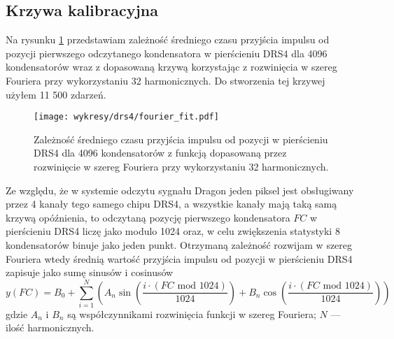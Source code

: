 \documentclass[a4paper,11pt,twoside]{article}
\begin{document}
\subsection{Krzywa kalibracyjna}
Na rysunku \ref{fig:fourier_fit_4096} przedstawiam zależność średniego czasu przyjścia impulsu od pozycji pierwszego odczytanego kondensatora w pierścieniu DRS4 dla 4096 kondensatorów wraz z dopasowaną krzywą korzystając z rozwinięcia w szereg Fouriera przy wykorzystaniu 32 harmonicznych. Do stworzenia tej krzywej użyłem 11 500 zdarzeń.
\begin{figure}[H] 
\centering
\texttt{[image: wykresy/drs4/fourier\_fit.pdf]}
\caption{Zależność średniego czasu przyjścia impulsu od pozycji w pierścieniu DRS4 dla 4096 kondensatorów z funkcją dopasowaną przez rozwinięcie w szereg Fouriera przy wykorzystaniu 32 harmonicznych.}
\label{fig:fourier_fit_4096}
\end{figure}
Ze względu, że w systemie odczytu sygnału Dragon jeden piksel jest obsługiwany przez 4 kanały tego samego chipu DRS4, a wszystkie kanały mają taką samą krzywą opóźnienia, to odczytaną pozycję pierwszego kondensatora $FC$ w pierścieniu DRS4 liczę jako modulo 1024 oraz, w celu zwiększenia statystyki 8 kondensatorów binuje jako jeden punkt. 
Otrzymaną zależność rozwijam w szereg Fouriera wtedy
średnią wartość przyjścia impulsu od pozycji w pierścieniu DRS4 zapisuje jako sumę sinusów i cosinusów
\begin{equation}
y(FC) = B_0 + \sum_{i=1}^{N} \left( A_n \sin \left( \frac{ i \cdot (FC \text{ mod } 1024)  }{1024} \right) + B_n \cos \left( \frac{i \cdot (FC \text{ mod } 1024) }{1024} \right) \right)
\end{equation}
gdzie $A_n$ i $B_n$ są współczynnikami rozwinięcia funkcji w szereg Fouriera; $N$ --- ilość harmonicznych.
\end{document}
